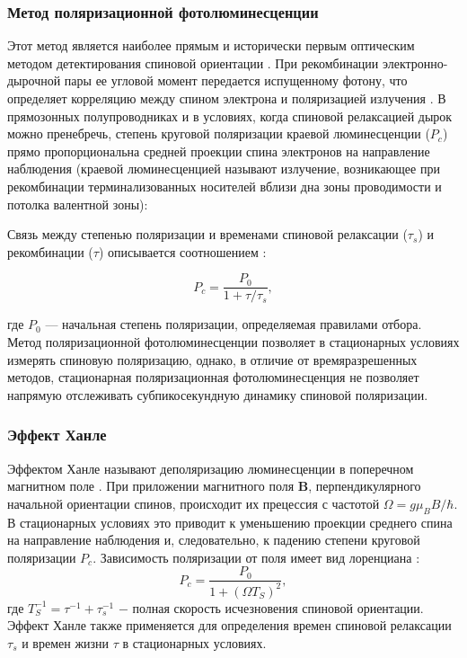 \documentclass[14pt]{extarticle}
\numberwithin{equation}{section}
\begin{document}
\subsubsection{Метод поляризационной фотолюминесценции}

Этот метод является наиболее прямым и исторически первым оптическим методом детектирования спиновой ориентации \cite{Parsons}. При рекомбинации электронно-дырочной пары ее угловой момент передается испущенному фотону, что определяет корреляцию между спином электрона и поляризацией излучения \cite{Lampel}. В прямозонных полупроводниках и в условиях, когда спиновой релаксацией дырок можно пренебречь, степень круговой поляризации краевой люминесценции ($P_c$) прямо пропорциональна средней проекции спина электронов на направление наблюдения  (краевой люминесценцией называют излучение, возникающее при рекомбинации терминализованных носителей вблизи дна зоны проводимости и потолка валентной зоны):

Связь между степенью поляризации и временами спиновой релаксации ($\tau_s$) и рекомбинации ($\tau$) описывается соотношением \cite{zakharchenya_opt_or}:

\begin{equation}
P_c = \frac{P_0}{1 + \tau / \tau_s},
\end{equation}

где $P_0$ — начальная степень поляризации, определяемая правилами отбора. Метод поляризационной фотолюминесценции позволяет в стационарных условиях измерять спиновую поляризацию, однако, в отличие от времяразрешенных методов, стационарная поляризационная фотолюминесценция не позволяет напрямую отслеживать субпикосекундную динамику спиновой поляризации.

\subsubsection{Эффект Ханле}

Эффектом Ханле называют деполяризацию люминесценции в поперечном магнитном поле \cite{hanle_uber_1924}. При приложении магнитного поля $\mathbf{B}$, перпендикулярного начальной ориентации спинов, происходит их прецессия с частотой $\Omega = g\mu_B B/\hbar$. В стационарных условиях это приводит к уменьшению проекции среднего спина на направление наблюдения и, следовательно, к падению степени круговой поляризации $P_c$. Зависимость поляризации от поля имеет вид лоренциана \cite{zakharchenya_opt_or}:
\begin{equation}
P_c = \frac{P_0}{1 + (\Omega T_S)^2},
\end{equation}
где $T_S^{-1} = \tau^{-1} + \tau_s^{-1}$ $-$ полная скорость исчезновения спиновой ориентации. Эффект Ханле также применяется для определения времен спиновой релаксации $\tau_s$ и времен жизни $\tau$ в стационарных условиях.
\end{document}
